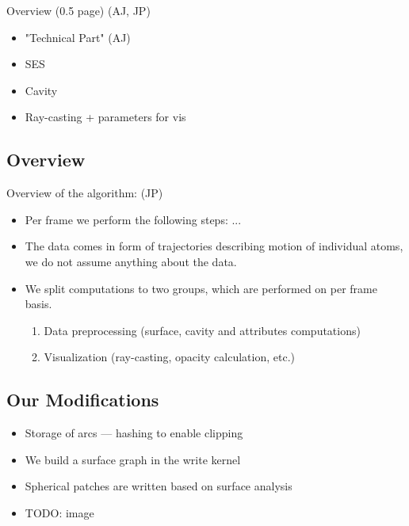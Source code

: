 Overview (0.5 page) (AJ, JP)
\begin{itemize}
  \item "Technical Part" (AJ)
  \item SES
  \item Cavity
  \item Ray-casting + parameters for vis
\end{itemize}

\subsection{Overview}
Overview of the algorithm: (JP)
\begin{itemize}
  \item Per frame we perform the following steps: ...
  \item The data comes in form of trajectories describing motion of individual atoms, we do not assume anything about the data.
  \item We split computations to two groups, which are performed on per frame basis.
	\begin{enumerate}
	  \item Data preprocessing (surface, cavity and attributes computations)
		\item Visualization  (ray-casting, opacity calculation, etc.)
	\end{enumerate}
\end{itemize}

\subsection{Our Modifications}
\begin{itemize}
  \item Storage of arcs --- hashing to enable clipping
	\item We build a surface graph in the write kernel
	\item Spherical patches are written based on surface analysis
	\item TODO: image
\end{itemize}

